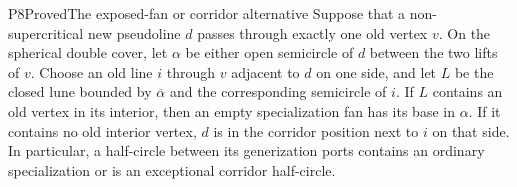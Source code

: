 \begin{resultenv}{P8}{Proved}{The exposed-fan or corridor alternative}
Suppose that a non-supercritical new pseudoline $d$ passes through
exactly one old vertex $v$.  On the spherical double cover, let $\alpha$ be either
open semicircle of $d$ between the two lifts of $v$.  Choose an old
line $i$ through $v$ adjacent to $d$ on one side, and let $L$ be the
closed lune bounded by $\overline\alpha$ and the corresponding
semicircle of $i$.  If $L$ contains an old vertex in its interior,
then an empty specialization fan has its base in $\alpha$.  If it
contains no old interior vertex, $d$ is in the corridor position next
to $i$ on that side.  In particular, a half-circle between its
generization ports contains an
ordinary specialization or is an exceptional corridor half-circle.
\end{resultenv}


